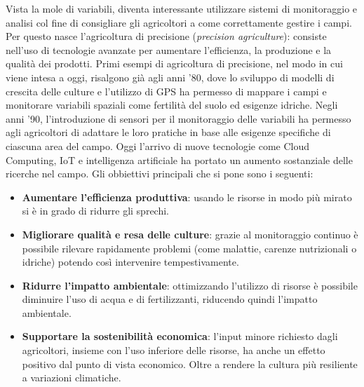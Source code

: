 \documentclass[12pt,a4paper,openright,twoside]{book}
\begin{document}
Vista la mole di variabili, diventa interessante utilizzare sistemi di monitoraggio e analisi col fine di consigliare gli agricoltori a come correttamente gestire i campi. Per questo nasce l'agricoltura di precisione (\textit{precision agriculture}): consiste nell'uso di tecnologie avanzate per aumentare l'efficienza, la produzione e la qualità dei prodotti.
Primi esempi di agricoltura di precisione, nel modo in cui viene intesa a oggi, risalgono già agli anni '80, dove lo sviluppo di modelli di crescita delle culture e l'utilizzo di \ac{GPS} ha permesso di mappare i campi e monitorare variabili spaziali come fertilità del suolo ed esigenze idriche.
Negli anni '90, l'introduzione di sensori per il monitoraggio delle variabili ha permesso agli agricoltori di adattare le loro pratiche in base alle esigenze specifiche di ciascuna area del campo.
Oggi l'arrivo di nuove tecnologie come Cloud Computing, \ac{IoT} e intelligenza artificiale ha portato un aumento sostanziale delle ricerche nel campo.
Gli obbiettivi principali che si pone sono i seguenti:
\begin{itemize}[noitemsep]
    \item \textbf{Aumentare l'efficienza produttiva}: usando le risorse in modo più mirato si è in grado di ridurre gli sprechi.
    \item \textbf{Migliorare qualità e resa delle culture}: grazie al monitoraggio continuo è possibile rilevare rapidamente problemi (come malattie, carenze nutrizionali o idriche) potendo così intervenire tempestivamente.
    \item \textbf{Ridurre l'impatto ambientale}: ottimizzando l'utilizzo di risorse è possibile diminuire l'uso di acqua e di fertilizzanti, riducendo quindi l'impatto ambientale.
    \item \textbf{Supportare la sostenibilità economica}: l'input minore richiesto dagli agricoltori, insieme con l'uso inferiore delle risorse, ha anche un effetto positivo dal punto di vista economico. Oltre a rendere la cultura più resiliente a variazioni climatiche.
\end{itemize}
\end{document}
